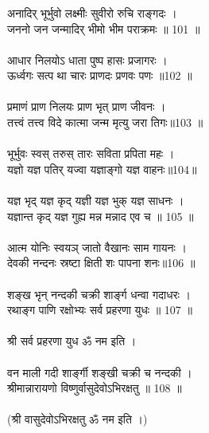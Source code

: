 \subsubsection{}
अनादिर् भूर्भुवो लक्ष्मीः सुवीरो रुचि राङ्गदः ।\\
जननो जन जन्मादिर् भीमो भीम पराक्रमः ॥ 101 ॥\\
\\
आधार निलयोऽ धाता पुष्प हासः प्रजागरः ।\\
ऊर्ध्वगः सत्प था चारः प्राणदः प्रणवः पणः ॥102 ॥\\
\\
प्रमाणं प्राण निलयः प्राण भृत् प्राण जीवनः ।\\
तत्त्वं तत्त्व विदे कात्मा जन्म मृत्यु जरा तिगः॥103 ॥\\
\\
भूर्भुवः स्वस् तरुस् तारः सविता प्रपिता महः ।\\
यज्ञो यज्ञ पतिर् यज्वा यज्ञाङ्गो यज्ञ वाहनः॥104॥\\
\\
यज्ञ भृद् यज्ञ कृद् यज्ञी यज्ञ भुक् यज्ञ साधनः ।\\
यज्ञान्त कृद् यज्ञ गुह्य मन्न मन्नाद एव च ॥ 105 ॥\\
\\
आत्म योनिः स्वयञ् जातो वैखानः साम गायनः ।\\
देवकी नन्दनः स्रष्टा क्षिती शः पापना शनः॥106 ॥\\
\\
शङ्ख भृन् नन्दकी चक्री शार्ङ्ग धन्वा गदाधरः ।\\
रथाङ्ग पाणि रक्षोभ्यः सर्व प्रहरणा युधः ॥ 107 ॥\\
\\
श्री सर्व प्रहरणा युध ॐ नम इति ।\\
\\
वन माली गदी शार्ङ्गी शङ्खी चक्री च नन्दकी ।\\
श्रीमान्नारायणो विष्णुर्वासुदेवोऽभिरक्षतु ॥ 108 ॥\\
\\
(श्री वासुदेवोऽभिरक्षतु ॐ नम इति ।)\\
